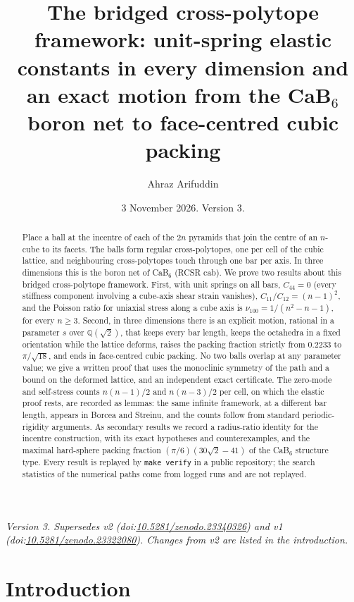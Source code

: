 \documentclass[11pt]{amsart}
\title[The bridged cross-polytope framework]{The bridged cross-polytope framework: unit-spring elastic constants in every dimension and an exact motion from the CaB$_6$ boron net to face-centred cubic packing}
\author{Ahraz Arifuddin}
\date{3 November 2026. Version 3.}
\theoremstyle{definition}
\theoremstyle{remark}
\newcommand{\Q}{\mathbb{Q}}
\newcommand{\nus}{\nu_{100}}
\begin{document}
\begin{abstract}
Place a ball at the incentre of each of the $2n$ pyramids that join the centre of an $n$-cube to its facets. The balls form regular cross-polytopes, one per cell of the cubic lattice, and neighbouring cross-polytopes touch through one bar per axis. In three dimensions this is the boron net of CaB$_6$ (RCSR \textsf{cab}). We prove two results about this bridged cross-polytope framework. First, with unit springs on all bars, $C_{44}=0$ (every stiffness component involving a cube-axis shear strain vanishes), $C_{11}/C_{12}=(n-1)^2$, and the Poisson ratio for uniaxial stress along a cube axis is $\nus=1/(n^2-n-1)$, for every $n\ge3$. Second, in three dimensions there is an explicit motion, rational in a parameter $s$ over $\Q(\sqrt2)$, that keeps every bar length, keeps the octahedra in a fixed orientation while the lattice deforms, raises the packing fraction strictly from $0.2233$ to $\pi/\sqrt{18}$, and ends in face-centred cubic packing. No two balls overlap at any parameter value; we give a written proof that uses the monoclinic symmetry of the path and a bound on the deformed lattice, and an independent exact certificate. The zero-mode and self-stress counts $n(n-1)/2$ and $n(n-3)/2$ per cell, on which the elastic proof rests, are recorded as lemmas: the same infinite framework, at a different bar length, appears in Borcea and Streinu, and the counts follow from standard periodic-rigidity arguments. As secondary results we record a radius-ratio identity for the incentre construction, with its exact hypotheses and counterexamples, and the maximal hard-sphere packing fraction $(\pi/6)(30\sqrt2-41)$ of the CaB$_6$ structure type. Every result is replayed by \texttt{make verify} in a public repository; the search statistics of the numerical paths come from logged runs and are not replayed.
\end{abstract}

\maketitle

{\raggedright\noindent\emph{Version 3. Supersedes v2 (doi:\href{https://doi.org/10.5281/zenodo.23340326}{10.5281/zenodo.23340326}) and v1 (doi:\href{https://doi.org/10.5281/zenodo.23322080}{10.5281/zenodo.23322080}). Changes from v2 are listed in the introduction.}\par}

\section{Introduction}
\end{document}
